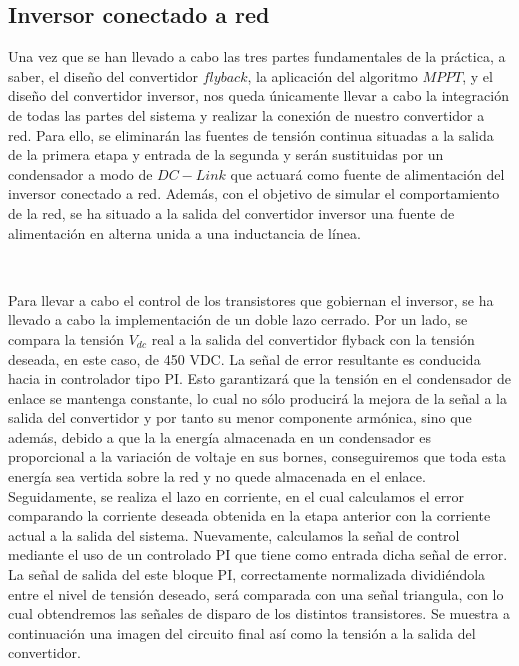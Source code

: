 \documentclass[	DIV=calc,%
							paper=letter,%
							fontsize=12pt%
                            ]{scrartcl}	 					%
\begin{document}
\newpage

\subsection{Inversor conectado a red}

\hfill

Una vez que se han llevado a cabo las tres partes fundamentales de la práctica, a saber, el diseño del convertidor $flyback$, la aplicación del algoritmo $MPPT$, y el diseño del convertidor inversor, nos queda únicamente llevar a cabo la integración de todas las partes del sistema y realizar la conexión de nuestro convertidor a red. Para ello, se eliminarán las fuentes de tensión continua situadas a la salida de la primera etapa y entrada de la segunda y serán sustituidas por un condensador a modo de $DC-Link$ que actuará como fuente de alimentación del inversor conectado a red. Además, con el objetivo de simular el comportamiento de la red, se ha situado a la salida del convertidor inversor una fuente de alimentación en alterna unida a una inductancia de línea.

\hfill
\

Para llevar a cabo el control de los transistores que gobiernan el inversor, se ha llevado a cabo la implementación de un doble lazo cerrado. Por un lado, se compara la tensión $V_{dc}$ real a la salida del convertidor flyback con la tensión deseada, en este caso, de 450 VDC. La señal de error resultante es conducida hacia in controlador tipo PI. Esto garantizará que la tensión en el condensador de enlace se mantenga constante, lo cual no sólo producirá la mejora de  la señal a la salida del convertidor y por tanto su menor componente armónica, sino que además, debido a que la la energía almacenada en un condensador es proporcional a la variación de voltaje en sus bornes, conseguiremos que toda esta energía sea vertida sobre la red y no quede almacenada en el enlace. Seguidamente, se realiza el lazo en corriente, en el cual calculamos el error comparando la corriente deseada obtenida en la etapa anterior con la corriente actual a la salida del sistema. Nuevamente, calculamos la señal de control mediante el uso de un controlado PI que tiene como entrada dicha señal de error. La señal de salida del este bloque PI, correctamente normalizada dividiéndola entre el nivel de tensión deseado, será comparada con una señal triangula, con lo cual obtendremos las señales de disparo de los distintos transistores. Se muestra a continuación una imagen del circuito final así como la tensión a la salida del convertidor.
\end{document}
